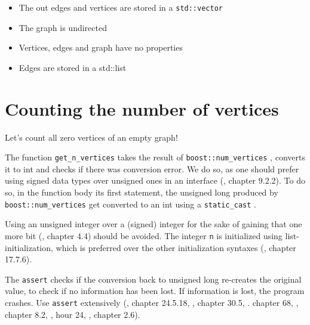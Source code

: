\begin{itemize}
  \item The out edges and vertices are stored in a 
    \verb;std::vector; 
  \item The graph is undirected
  \item Vertices, edges and graph have no properties
  \item Edges are stored in a std::list
\end{itemize}

\section{Counting the number of vertices}
\label{subsec:get_n_vertices}

Let's count all zero vertices of an empty graph!



The function \verb;get_n_vertices; takes the result of \verb;boost::num_vertices;
, converts it to int and checks if there was conversion error.
We do so, as one should prefer using signed data types over unsigned ones
in an interface (\cite{lakos1996large}, chapter 9.2.2).
To do so, in the function body its first statement, 
the unsigned long 
produced by \verb;boost::num_vertices; 
get converted to an int using a \verb;static_cast; .

Using an unsigned integer over a (signed) integer for the sake of gaining
that one more bit (\cite{stroustrup1997}, chapter 4.4) should be avoided.
The integer \verb;n; is initialized using list-initialization, which is preferred
over the other initialization syntaxes (\cite{stroustrup2013}, chapter 17.7.6).

The \verb;assert; checks if the conversion back to unsigned long re-creates the
original value, to check if no information has been lost.
If information is lost, the program crashes.
Use \verb;assert;  extensively 
(\cite{stroustrup1997}, chapter 24.5.18, 
\cite{stroustrup2013}, chapter 30.5, 
\cite{sutter_and_alexandrescu2004}. chapter 68, 
\cite{mcconnell2004code}, chapter 8.2, 
\cite{liberty2001sams}, hour 24, 
\cite{lakos1996large}, chapter 2.6).

